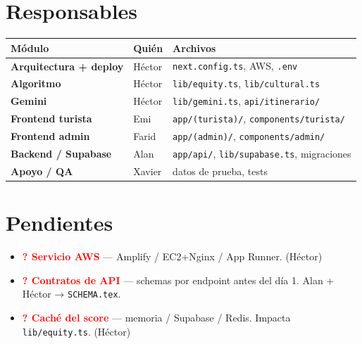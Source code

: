 \documentclass[11pt,a4paper]{article}
\newcommand{\pend}[1]{\textcolor{red}{\textbf{? #1}}}
\newcommand{\f}[1]{\texttt{\textcolor{d}{#1}}}
\begin{document}
\section{Responsables}

\begin{center}
\begin{tabular}{>{\bfseries}p{2.5cm} p{2.5cm} p{8.5cm}}
\toprule
Módulo & Quién & Archivos \\
\midrule
Arquitectura + deploy & Héctor & \f{next.config.ts}, AWS, \f{.env} \\
Algoritmo             & Héctor & \f{lib/equity.ts}, \f{lib/cultural.ts} \\
Gemini                & Héctor & \f{lib/gemini.ts}, \f{api/itinerario/} \\
Frontend turista      & Emi    & \f{app/(turista)/}, \f{components/turista/} \\
Frontend admin        & Farid  & \f{app/(admin)/}, \f{components/admin/} \\
Backend / Supabase    & Alan   & \f{app/api/}, \f{lib/supabase.ts}, migraciones \\
Apoyo / QA            & Xavier & datos de prueba, tests \\
\bottomrule
\end{tabular}
\end{center}

\section{Pendientes}

\begin{itemize}[leftmargin=*, itemsep=2pt]
  \item \pend{Servicio AWS} — Amplify / EC2+Nginx / App Runner. (Héctor)
  \item \pend{Contratos de API} — schemas por endpoint antes del día 1.
        Alan + Héctor → \f{SCHEMA.tex}.
  \item \pend{Caché del score} — memoria / Supabase / Redis.
        Impacta \f{lib/equity.ts}. (Héctor)
\end{itemize}

\end{document}
